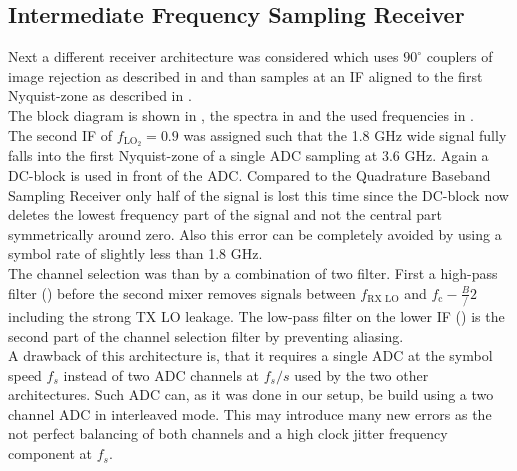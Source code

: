 \subsection{Intermediate Frequency Sampling Receiver}
\label{sec:rx_1}
Next a different receiver architecture was considered which uses
$90^\circ$ couplers of image rejection as described in 
and than samples at an \gls{IF} aligned to the first Nyquist-zone as described
in . \\

The block diagram is shown in , the spectra in
 and the used frequencies in . \\

The second \gls{IF} of $f_{\text{LO}_2} = 0.9$ was assigned such that
the 1.8 GHz wide signal fully falls into the first Nyquist-zone of
a single \gls{ADC} sampling at 3.6 GHz. Again a \gls{DC}-block
is used in front of the \gls{ADC}. Compared to the Quadrature Baseband
Sampling Receiver only half of the signal is lost this time since
the \gls{DC}-block now deletes the lowest frequency part of the signal
and not the central part symmetrically around zero. Also this error
can be completely avoided by using a symbol rate of slightly less
than 1.8 GHz. \\

The channel selection was than by a combination of two filter. First
a  high-pass filter () before
the second mixer removes signals between $f_{\text{RX LO}}$ and
$f_{\text{c}} - \frac{B}/{2}$ including the strong \gls{TX} \gls{LO}
leakage. The low-pass filter on the lower \gls{IF}
() is the second part of the channel
selection filter by preventing aliasing. \\

A drawback of this architecture is, that it requires a single \gls{ADC}
at the symbol speed $f_{s}$ instead of two \gls{ADC} channels at
$f_{s} / s$ used by the two other architectures. Such \gls{ADC} can,
as it was done in our setup, be build using a two channel \gls{ADC}
in interleaved mode. This may introduce many new errors as the not
perfect balancing of both channels and a high clock jitter frequency
component at $f_{s}$. \\

